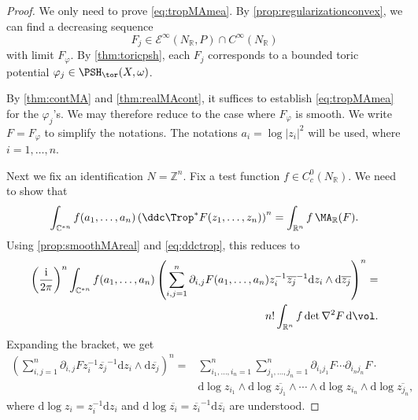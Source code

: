 \begin{proof}
    We only need to prove \eqref{eq:tropMAmea}. By \cref{prop:regularizationconvex}, we can find a decreasing sequence
    \[
        F_j\in \mathcal E^\infty(N_{\mathbb R},P)\cap C^\infty(N_{\mathbb R})
    \]
    with limit $F_\varphi$. By \cref{thm:toricpsh}, each $F_j$ corresponds to a bounded toric potential $\varphi_j\in\PSH_{\tor}(X,\omega)$.

    By \cref{thm:contMA} and \cref{thm:realMAcont}, it suffices to establish \eqref{eq:tropMAmea} for the $\varphi_j$'s. We may therefore reduce to the case where $F_{\varphi}$ is smooth. We write $F=F_{\varphi}$ to simplify the notations. The notations $a_i=\log |z_i|^2$ will be used, where $i=1,\ldots,n$.

    Next we fix an identification $N=\mathbb{Z}^n$. Fix a test function $f\in C^{0}_c(N_{\mathbb{R}})$. We need to show that
    \[
    \int_{\mathbb{C}^{*n}}f(a_1,\ldots,a_n) \left(\ddc \Trop^* F(z_1,\ldots,z_n)\right)^n=\int_{\mathbb{R}^n} f\,\MA_{\mathbb{R}}(F).
    \]
    Using \cref{prop:smoothMAreal} and \eqref{eq:ddctrop}, this reduces to
    \begin{equation}\label{eq:realcplxMAtemp1}
    \begin{split}
        \left( \frac{\mathrm{i}}{2\pi}\right)^n\int_{\mathbb{C}^{*n}}f(a_1,\ldots,a_n)
        \left(\sum_{i,j=1}^n \partial_{i,j}F(a_1,\ldots,a_n)z_i^{-1}\overline{z_j}^{-1}\mathrm{d}z_i\wedge \mathrm{d}\overline{z_j}\right)^n=\\
        n!\int_{\mathbb{R}^n} f \det \nabla^2 F\,\mathrm{d}\vol.
    \end{split}
    \end{equation}
    Expanding the bracket, we get
    \[
    \begin{aligned}
        \left(\sum_{i,j=1}^n \partial_{i,j}Fz_i^{-1}\overline{z_j}^{-1}\mathrm{d}z_i\wedge \mathrm{d}\overline{z_j}\right)^n
        =& \sum_{i_1,\ldots,i_n=1}^n \sum_{j_1,\ldots,j_n=1}^n \partial_{i_1j_1}F\cdots \partial_{i_nj_n}F\cdot \\
        &\mathrm{d}\log z_{i_1}\wedge \mathrm{d}\log \overline{z_{j_1}}\wedge \cdots\wedge \mathrm{d}\log z_{i_n}\wedge \mathrm{d}\log \overline{z_{j_n}},
    \end{aligned}
    \]
    where $\mathrm{d}\log z_i=z_i^{-1}\mathrm{d}z_i$ and $\mathrm{d}\log \overline{z_i}=\overline{z_i}^{-1}\mathrm{d}\overline{z_i}$ are understood.


\end{proof}
